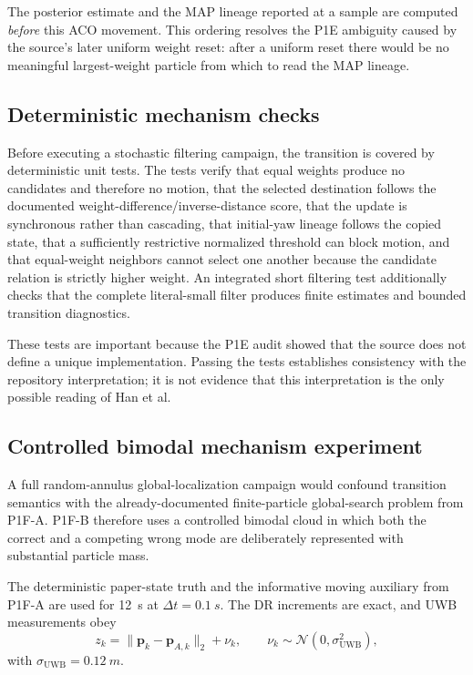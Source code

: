 The posterior estimate and the MAP lineage reported at a sample are computed \emph{before} this ACO movement. This ordering resolves the P1E ambiguity caused by the source's later uniform weight reset: after a uniform reset there would be no meaningful largest-weight particle from which to read the MAP lineage.

\subsection{Deterministic mechanism checks}
Before executing a stochastic filtering campaign, the transition is covered by deterministic unit tests. The tests verify that equal weights produce no candidates and therefore no motion, that the selected destination follows the documented weight-difference/inverse-distance score, that the update is synchronous rather than cascading, that initial-yaw lineage follows the copied state, that a sufficiently restrictive normalized threshold can block motion, and that equal-weight neighbors cannot select one another because the candidate relation is strictly higher weight. An integrated short filtering test additionally checks that the complete literal-small filter produces finite estimates and bounded transition diagnostics.

These tests are important because the P1E audit showed that the source does not define a unique implementation. Passing the tests establishes consistency with the repository interpretation; it is not evidence that this interpretation is the only possible reading of Han et al.

\subsection{Controlled bimodal mechanism experiment}
A full random-annulus global-localization campaign would confound transition semantics with the already-documented finite-particle global-search problem from P1F-A. P1F-B therefore uses a controlled bimodal cloud in which both the correct and a competing wrong mode are deliberately represented with substantial particle mass.

The deterministic paper-state truth and the informative moving auxiliary from P1F-A are used for \SI{12}{s} at $\Delta t=\SI{0.1}{s}$. The DR increments are exact, and UWB measurements obey
\begin{equation}
    z_k=\lVert\bm p_k-\bm p_{A,k}\rVert_2+\nu_k,
    \qquad
    \nu_k\sim\mathcal N(0,\sigma_{\mathrm{UWB}}^2),
\end{equation}
with $\sigma_{\mathrm{UWB}}=\SI{0.12}{m}$.


